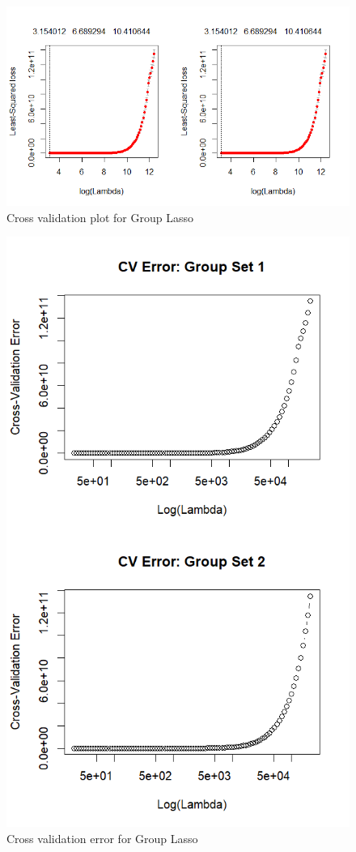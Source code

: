 \documentclass[a4paper, 9pt]{article}
\begin{document}
\begin{figure}[H]
\includegraphics[scale=0.85]{gglassocv}
\centering
\caption{Cross validation plot for Group Lasso}
\end{figure}

\begin{figure}[H]
\includegraphics[scale=0.85]{gglassocverror}
\centering
\caption{Cross validation error for Group Lasso}
\end{figure}
\end{document}
